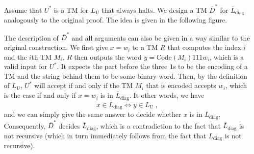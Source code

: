 \documentclass{exercise}
\begin{document}
  \begin{solution}
		Assume that $U^*$ is a TM for $L_{\text{U}}$ that always halts.  We
		design a TM $\overline{D}^*$ for $\overline{L}_{\text{diag}}$
		analogously to the original proof.  The idea is given in the following
		figure.
    \begin{center}
    \end{center}
    The description of $\overline{D}^*$ and all arguments can also be given in a way
		similar to the original construction.
    We first give $x=w_i$ to a TM $R$ that computes the index $i$ and the $i$th TM $M_i$.
    $R$ then outputs the word $y=\text{Code}(M_i)111w_i$, which is a valid
    input for $U^*$.  It expects the part before the three $1$s to
    be the encoding of a TM and the string behind them to be some binary word.  Then,
    by the definition of $L_{\text{U}}$, $U^*$ will accept if and only if
    the TM $M_i$ that is encoded accepts $w_i$, which is the case if and only if
    $x=w_i$ is in $\overline{L}_{\text{diag}}$.  It other words, we have
    \[ x\in \overline{L}_{\text{diag}} \iff y\in L_{\text{U}} \;, \]
    and we can simply give the same answer to decide whether $x$ is in
    $\overline{L}_{\text{diag}}$.  Consequently, $\overline{D}^*$ decides
    $\overline{L}_{\text{diag}}$, which is a contradiction to the fact that
    $\overline{L}_{\text{diag}}$ is not recursive (which in turn immediately follows
    from the fact that $L_{\text{diag}}$ is not recursive).
  \end{solution}
\end{document}
